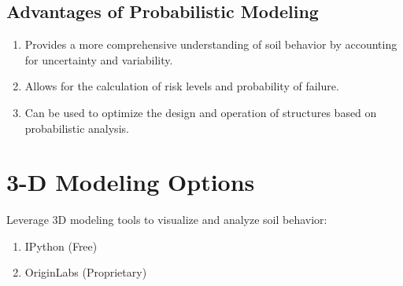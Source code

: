 \subsection{Advantages of Probabilistic Modeling}
\begin{enumerate}
    \item Provides a more comprehensive understanding of soil behavior by accounting for uncertainty and variability.
    \item Allows for the calculation of risk levels and probability of failure.
    \item Can be used to optimize the design and operation of structures based on probabilistic analysis.
\end{enumerate}

\section{3-D Modeling Options}
Leverage 3D modeling tools to visualize and analyze soil behavior:
\begin{enumerate}
    \item IPython (Free)
    \item OriginLabs (Proprietary)
\end{enumerate}
